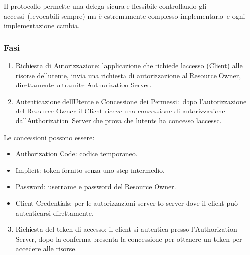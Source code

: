 \documentclass[
]{article}
\providecommand{\tightlist}{%
  \setlength{\itemsep}{0pt}\setlength{\parskip}{0pt}}
\begin{document}
{}

{Il protocollo permette una }{delega sicura e flessibile controllando
gli accessi}{~(revocabili sempre) }{ma }{è }{estremamente complesso
implementarlo}{~}{e ogni implementazione cambia}{.}

\subsubsection{\texorpdfstring{{Fasi}}{Fasi}}\label{h.lpbkiymexl3w}

\begin{enumerate}
\tightlist
\item
  {Richiesta di Autorizzazione}{: l\textquotesingle applicazione che
  richiede l\textquotesingle accesso (Client) alle risorse
  dell\textquotesingle utente, invia una richiesta di autorizzazione al
  Resource Owner, direttamente o tramite Authorization Server.}
\end{enumerate}

{}

\begin{enumerate}
\setcounter{enumi}{1}
\tightlist
\item
  {Autenticazione dell\textquotesingle Utente e Concessione dei
  Permessi:}{~dopo l'autorizzazione del Resource Owner il Client riceve
  una concessione di autorizzazione
  }{dall\textquotesingle Authorization}{~Server che prova che
  l\textquotesingle utente ha concesso l\textquotesingle accesso.}
\end{enumerate}

{Le concessioni possono essere:}

\begin{itemize}
\tightlist
\item
  {Authorization Code}{: codice temporaneo.}
\item
  {Implicit}{: token fornito senza uno step intermedio. }
\item
  {Password}{: username e password del Resource Owner.}
\item
  {Client Credentials}{: per le autorizzazioni server-to-server dove il
  client può autenticarsi direttamente.}
\end{itemize}

{}

\begin{enumerate}
\setcounter{enumi}{2}
\tightlist
\item
  {Richiesta del token di accesso}{: il client si autentica presso
  l'Authorization Server, dopo la conferma presenta la concessione per
  ottenere un token per accedere alle risorse.}
\end{enumerate}
\end{document}
